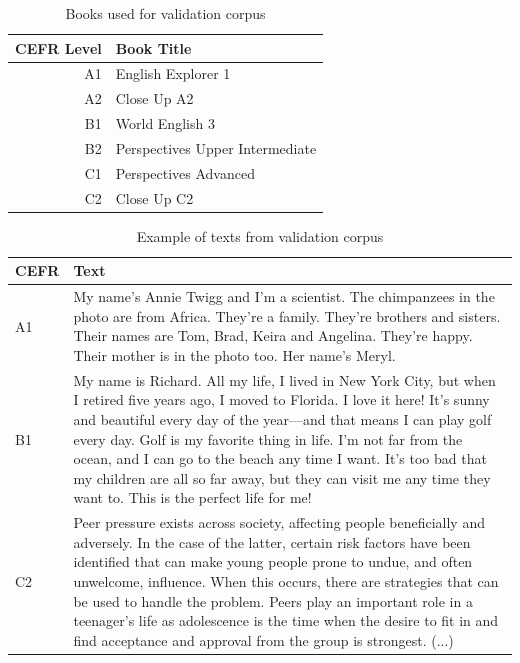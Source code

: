 \documentclass[11pt,a4paper]{article}
\begin{document}
\begin{table}
  \centering
  \begin{tabular}{r|l}
    \toprule
    CEFR Level & Book Title\\
    \midrule
    A1 & English Explorer 1\\
    A2 & Close Up A2\\
    B1 & World English 3\\
    B2 & Perspectives Upper Intermediate\\
    C1 & Perspectives Advanced\\
    C2 & Close Up C2\\
    \bottomrule
  \end{tabular}
  \caption{Books used for validation corpus}
  \label{tab:validation-books}
\end{table}

\begin{table}
  \centering
  \begin{tabular}{l|p{}}
    \toprule
    CEFR & Text\\
    \midrule
    A1 & My name's Annie Twigg and I'm a scientist. The chimpanzees in the photo are
    from Africa. They're a family. They're brothers and sisters. Their names
    are Tom, Brad, Keira and Angelina. They're happy. Their mother is in the
    photo too. Her name’s Meryl.\\
    \midrule
    B1 & My name is Richard. All my life, I lived in New York City, but when I
    retired five years ago, I moved to Florida. I love it here! It’s sunny and
    beautiful every day of the year—and that means I can play golf every day.
    Golf is my favorite thing in life. I'm not far from the ocean, and I can go
    to the beach any time I want. It’s too bad that my children are all so far
    away, but they can visit me any time they want to. This is the perfect life
    for me!\\
    \midrule
    C2 & Peer pressure exists across society, affecting people beneficially and adversely.
    In the case of the latter, certain risk factors have been identified that can make
    young people prone to undue, and often unwelcome, influence. When this occurs,
    there are strategies that can be used to handle the problem.
    Peers play an important role in a teenager's life as adolescence is the time
    when the desire to fit in and find acceptance and approval from the group is
    strongest. (...)\\
    \bottomrule
  \end{tabular}
  \caption{Example of texts from validation corpus}
  \label{tab:validation-examples}
\end{table}
\end{document}
